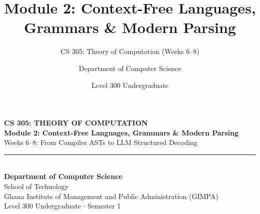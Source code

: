 \documentclass[aspectratio=169, 10pt]{beamer}
\title{Module 2: Context-Free Languages, Grammars \& Modern Parsing}
\subtitle{CS 305: Theory of Computation (Weeks 6--8)}
\author{Department of Computer Science}
\institute{Ghana Institute of Management and Public Administration (GIMPA)}
\date{Level 300 Undergraduate}
\begin{document}
\begin{frame}[plain]
  \vspace{1.0cm}
  \begin{center}
    {\large\bfseries\color{gimpaaccent} CS 305: THEORY OF COMPUTATION}\\[0.25cm]
    {\Large\bfseries\color{gimpanavy} Module 2: Context-Free Languages, Grammars \& Modern Parsing}\\[0.15cm]
    {\normalsize\color{gimpaslate} Weeks 6--8: From Compiler ASTs to LLM Structured Decoding}\\[0.6cm]
    
    {\color{ruleGray}\rule{0.50\textwidth}{0.8pt}}\\[0.65cm]
    
    {\normalsize\bfseries\color{charcoalText} Department of Computer Science}\\[0.12cm]
    {\footnotesize\color{gimpaslate} School of Technology}\\[0.12cm]
    {\footnotesize\color{gimpaslate} Ghana Institute of Management and Public Administration (GIMPA)}\\[0.45cm]
    {\footnotesize\color{gimpaslate} Level 300 Undergraduate $\cdot$ Semester 1}
  \end{center}
\end{frame}
\end{document}
